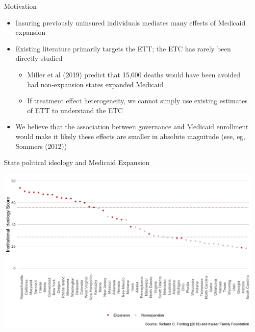 \documentclass[hyperref={pdfpagelabels=false}]{beamer}
\begin{document}
\begin{frame}{Motivation}
    \begin{itemize}
    \item Insuring previously uninsured individuals mediates many effects of Medicaid expansion \bigskip
    \item Existing literature primarily targets the ETT; the ETC has rarely been directly studied \bigskip
    \begin{itemize}
        \item Miller et al (2019) predict that 15,000 deaths would have been avoided had non-expansion states expanded Medicaid \bigskip
        \item If treatment effect heterogeneity, we cannot simply use existing estimates of ETT to understand the ETC \bigskip
    \end{itemize}
    \item We believe that the association between governance and Medicaid enrollment would make it likely these effects are smaller in absolute magnitude (see, eg, Sommers (2012)) \bigskip
    \end{itemize} 
\end{frame}

\begin{frame}{State political ideology and Medicaid Expansion}
    \begin{center}
	\includegraphics[scale=0.5]{01_Plots/political-expansion-plot.png}
    \end{center}
\end{frame}
\end{document}
